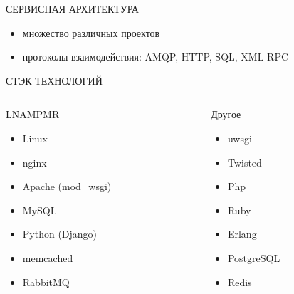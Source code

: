 \documentclass[aspectratio=169]{beamer}
\begin{document}
\begin{frame}{СЕРВИСНАЯ АРХИТЕКТУРА}
    \begin{itemize}
        \item множество различных проектов
        \item протоколы взаимодействия: AMQP, HTTP, SQL, XML-RPC
    \end{itemize}
\end{frame}

\begin{frame}{СТЭК ТЕХНОЛОГИЙ}
    \begin{columns}
        \begin{column}{0.4\textwidth}
            \begin{block}{LNAMPMR}
            \begin{itemize}
                \item Linux
                \item nginx
                \item Apache (mod\_wsgi)
                \item MySQL
                \item Python (Django)
                \item memcached
                \item RabbitMQ
            \end{itemize}
            \end{block}
        \end{column}

        \begin{column}{0.4\textwidth}
            \begin{block}{Другое}
            \begin{itemize}
                \item uwsgi
                \item Twisted
                \item Php
                \item Ruby
                \item Erlang
                \item PostgreSQL
                \item Redis
            \end{itemize}
            \end{block}
        \end{column}
    \end{columns}
\end{frame}
\end{document}
